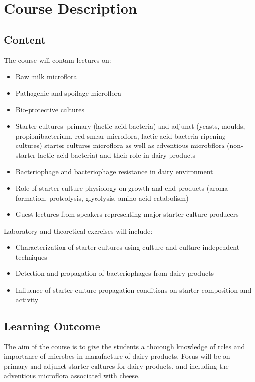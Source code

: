 \chapter{Course Description}
\section{Content}
The course will contain lectures on:
\begin{highlight}
    \begin{itemize}
        \item Raw milk microflora
        \item Pathogenic and spoilage microflora
        \item Bio-protective cultures
        \item Starter cultures: primary (lactic acid bacteria) and adjunct (yeasts, moulds, propionibacterium, red smear microflora, lactic acid bacteria ripening cultures) starter cultures microflora as well as adventious microbflora (non-starter lactic acid bacteria) and their role in dairy products
        \item Bacteriophage and bacteriophage resistance in dairy environment
        \item Role of starter culture physiology on growth and end products (aroma formation, proteolysis, glycolysis, amino acid catabolism)
        \item Guest lectures from speakers representing major starter culture producers
    \end{itemize}
\end{highlight}

Laboratory and theoretical exercises will include:
\begin{highlight}
    \begin{itemize}
        \item Characterization of starter cultures using culture and culture independent techniques
        \item Detection and propagation of bacteriophages from dairy products
        \item Influence of starter culture propagation conditions on starter composition and activity
    \end{itemize}
\end{highlight}

\section{Learning Outcome}
The aim of the course is to give the students a thorough knowledge of roles and importance of microbes in manufacture of dairy products. Focus will be on primary and adjunct starter cultures for dairy products, and including the adventious microflora associated with cheese.

